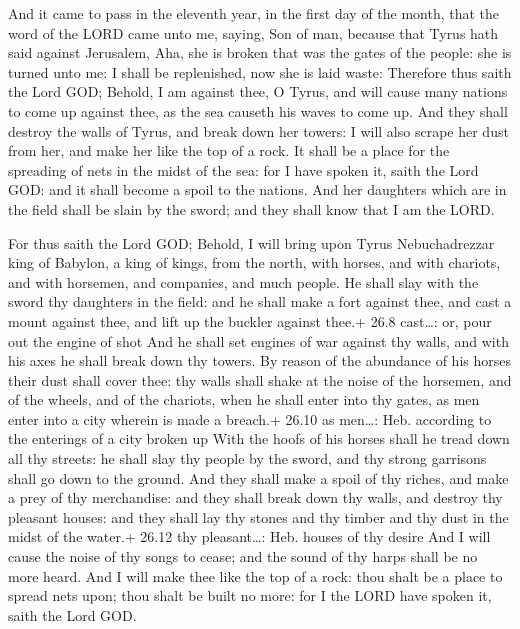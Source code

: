  And it came to pass in the eleventh year, in the first day
of the month, that the word of the LORD came unto me, saying,
 Son of man, because that Tyrus hath said against Jerusalem,
Aha, she is broken that was the gates of the people: she is turned unto
me: I shall be replenished, now she is laid waste: 
Therefore thus saith the Lord GOD; Behold, I am against thee, O Tyrus,
and will cause many nations to come up against thee, as the sea causeth
his waves to come up.  And they shall destroy the walls of
Tyrus, and break down her towers: I will also scrape her dust from her,
and make her like the top of a rock.  It shall be a place
for the spreading of nets in the midst of the sea: for I have spoken it,
saith the Lord GOD: and it shall become a spoil to the nations.
 And her daughters which are in the field shall be slain by
the sword; and they shall know that I am the LORD.

 For thus saith the Lord GOD; Behold, I will bring upon
Tyrus Nebuchadrezzar king of Babylon, a king of kings, from the north,
with horses, and with chariots, and with horsemen, and companies, and
much people.  He shall slay with the sword thy daughters in
the field: and he shall make a fort against thee, and cast a mount
against thee, and lift up the buckler against thee.+ 26.8 cast\ldots:
or, pour out the engine of shot  And he shall set engines of
war against thy walls, and with his axes he shall break down thy towers.
 By reason of the abundance of his horses their dust shall
cover thee: thy walls shall shake at the noise of the horsemen, and of
the wheels, and of the chariots, when he shall enter into thy gates, as
men enter into a city wherein is made a breach.+ 26.10 as men\ldots:
Heb. according to the enterings of a city broken up  With
the hoofs of his horses shall he tread down all thy streets: he shall
slay thy people by the sword, and thy strong garrisons shall go down to
the ground.  And they shall make a spoil of thy riches, and
make a prey of thy merchandise: and they shall break down thy walls, and
destroy thy pleasant houses: and they shall lay thy stones and thy
timber and thy dust in the midst of the water.+ 26.12 thy
pleasant\ldots: Heb. houses of thy desire  And I will cause
the noise of thy songs to cease; and the sound of thy harps shall be no
more heard.  And I will make thee like the top of a rock:
thou shalt be a place to spread nets upon; thou shalt be built no more:
for I the LORD have spoken it, saith the Lord GOD.

